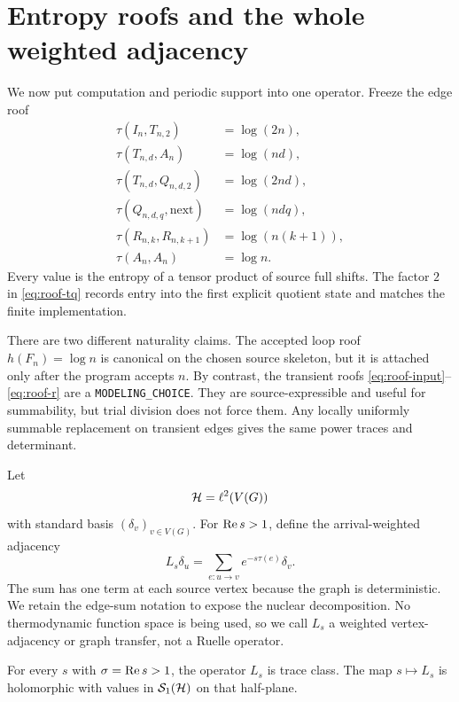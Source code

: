 \section{Entropy roofs and the whole weighted adjacency}
\label{sec:operator}

We now put computation and periodic support into one operator.  Freeze the
edge roof
\begin{align}
\tau(I_n,T_{n,2})&=\log(2n),\label{eq:roof-input}\\
\tau(T_{n,d},A_n)&=\log(nd),\label{eq:roof-accept}\\
\tau(T_{n,d},Q_{n,d,2})&=\log(2nd),\label{eq:roof-tq}\\
\tau(Q_{n,d,q},\mathrm{next})&=\log(ndq),\label{eq:roof-q}\\
\tau(R_{n,k},R_{n,k+1})&=\log(n(k+1)),\label{eq:roof-r}\\
\tau(A_n,A_n)&=\log n.\label{eq:roof-loop}
\end{align}
Every value is the entropy of a tensor product of source full shifts.  The
factor $2$ in \eqref{eq:roof-tq} records entry into the first explicit
quotient state and matches the finite implementation.

There are two different naturality claims.  The accepted loop roof
$h(F_n)=\log n$ is canonical on the chosen source skeleton, but it is
attached only after the program accepts $n$.  By contrast, the transient
roofs \eqref{eq:roof-input}--\eqref{eq:roof-r} are a
\texttt{MODELING\_CHOICE}.  They are source-expressible and useful for
summability, but trial division does not force them.  Any locally uniformly
summable replacement on transient edges gives the same power traces and
determinant.

Let
\[
\mathcal H=\ell^2(V(G))
\]
with standard basis $(\delta_v)_{v\in V(G)}$.  For $\operatorname{Re} s>1$, define the
arrival-weighted adjacency
\begin{equation}
L_s\delta_u=\sum_{e:u\to v}e^{-s\tau(e)}\delta_v.
\label{eq:operator}
\end{equation}
The sum has one term at each source vertex because the graph is
deterministic.  We retain the edge-sum notation to expose the nuclear
decomposition.  No thermodynamic function space is being used, so we call
$L_s$ a weighted vertex-adjacency or graph transfer, not a Ruelle operator.

\begin{theorem}
\label{thm:traceclass}
For every $s$ with $\sigma=\operatorname{Re} s>1$, the operator $L_s$ is trace class.
The map $s\mapsto L_s$ is holomorphic with values in $\mathcal S_1(\mathcal H)$ on that
half-plane.
\end{theorem}

